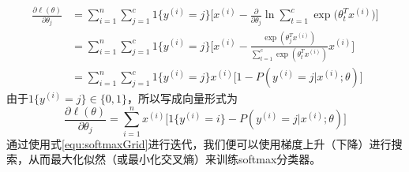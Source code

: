 \begin{equation}
\begin{split}
\frac{\partial \ell (\theta)}{\partial\theta_j} 
&=\sum\limits_{i=1}^n\sum\limits_{j=1}^c 1\{y^{(i)} = j\}\bigg[x^{(i)} - \frac{\partial}{\partial\theta_j}\ln \sum\limits_{t=1}^c \exp\big(\theta_t^T x^{(i)}\big)\bigg]\\
&=\sum\limits_{i=1}^n\sum\limits_{j=1}^c 1\{y^{(i)} = j\} \bigg[ x^{(i)} - \frac{\exp(\theta_j^T x^{(i)})}{\sum_{t=1}^c\exp(\theta_t^T x^{(i)})} x^{(i)}\bigg]\\
&=\sum\limits_{i=1}^n\sum\limits_{j=1}^c 1\{y^{(i)} = j\} x^{(i)} \bigg[1 - P(y^{(i)} = j|x^{(i)}; \theta)\bigg]
\end{split}
\end{equation}
由于$1\{y^{(i)} = j\} \in \{0, 1\}$，所以写成向量形式为
\begin{equation}\label{equ:softmaxGrid}
\frac{\partial \ell (\theta)}{\partial\theta_j}  = \sum\limits_{i=1}^n x^{(i)} \Big[1\{y^{(i)} = i\} - P(y^{(i)}=j|x^{(i)}; \theta)\Big]
\end{equation}
通过使用式\eqref{equ:softmaxGrid}进行迭代，我们便可以使用梯度上升（下降）进行搜索，从而最大化似然（或最小化交叉熵）来训练softmax分类器。

